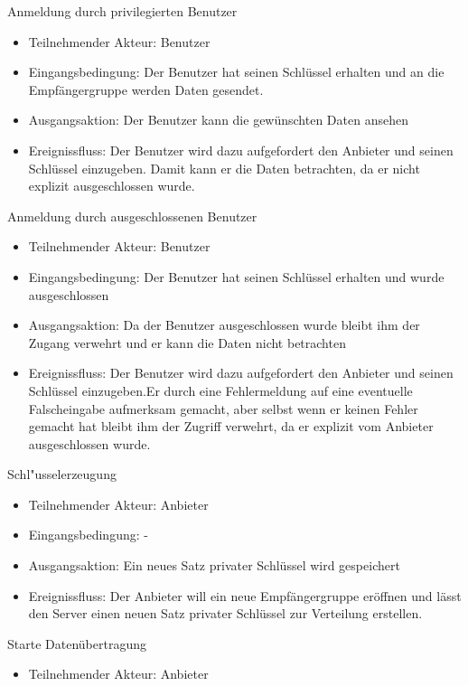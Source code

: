 \documentclass[a4paper,10pt]{scrartcl}
\begin{document}
\begin{usecase}
 {Anmeldung durch privilegierten Benutzer
   \begin{itemize}
   \item Teilnehmender Akteur: Benutzer
   \item Eingangsbedingung: Der Benutzer hat seinen Schlüssel erhalten und an die Empfängergruppe werden Daten gesendet.
   \item Ausgangsaktion: Der Benutzer kann die gewünschten Daten ansehen
   \item Ereignissfluss: Der Benutzer wird dazu aufgefordert den Anbieter und seinen Schlüssel
         einzugeben. Damit kann er die Daten betrachten, da er nicht explizit ausgeschlossen wurde.
   \end{itemize}
}
 {Anmeldung durch ausgeschlossenen Benutzer
   \begin{itemize}
   \item Teilnehmender Akteur: Benutzer
   \item Eingangsbedingung: Der Benutzer hat seinen Schlüssel erhalten und wurde ausgeschlossen
   \item Ausgangsaktion:  Da der Benutzer ausgeschlossen wurde bleibt ihm der Zugang verwehrt und er kann
             die Daten nicht betrachten
   \item Ereignissfluss: Der Benutzer wird dazu aufgefordert den Anbieter und seinen Schlüssel
         einzugeben.Er durch eine Fehlermeldung auf eine eventuelle Falscheingabe aufmerksam gemacht, aber selbst wenn er keinen
         Fehler gemacht hat bleibt ihm der Zugriff verwehrt, da er explizit vom Anbieter ausgeschlossen wurde.
   \end{itemize}
}
 {Schl"usselerzeugung
   \begin{itemize}
   \item Teilnehmender Akteur: Anbieter
   \item Eingangsbedingung: -
   \item Ausgangsaktion: Ein neues Satz privater Schlüssel wird gespeichert
   \item Ereignissfluss: Der Anbieter will ein neue Empfängergruppe eröffnen und lässt
         den Server einen neuen Satz privater Schlüssel zur Verteilung erstellen.
   \end{itemize}
}
 {Starte Datenübertragung
   \begin{itemize}
   \item Teilnehmender Akteur: Anbieter

\end{itemize}}
\end{usecase}
\end{document}
